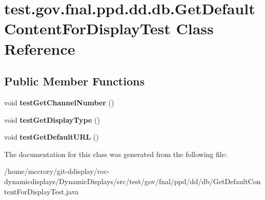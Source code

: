 \hypertarget{classtest_1_1gov_1_1fnal_1_1ppd_1_1dd_1_1db_1_1GetDefaultContentForDisplayTest}{\section{test.\-gov.\-fnal.\-ppd.\-dd.\-db.\-Get\-Default\-Content\-For\-Display\-Test Class Reference}
\label{classtest_1_1gov_1_1fnal_1_1ppd_1_1dd_1_1db_1_1GetDefaultContentForDisplayTest}
}
\subsection*{Public Member Functions}
\begin{DoxyCompactItemize}
\item 
\hypertarget{classtest_1_1gov_1_1fnal_1_1ppd_1_1dd_1_1db_1_1GetDefaultContentForDisplayTest_a537c7cee8b9dbb1afadb523af89feda6}{void {\bfseries test\-Get\-Channel\-Number} ()}\label{classtest_1_1gov_1_1fnal_1_1ppd_1_1dd_1_1db_1_1GetDefaultContentForDisplayTest_a537c7cee8b9dbb1afadb523af89feda6}

\item 
\hypertarget{classtest_1_1gov_1_1fnal_1_1ppd_1_1dd_1_1db_1_1GetDefaultContentForDisplayTest_a949d9e3ff3f8fea11b3cdee4bc8860e4}{void {\bfseries test\-Get\-Display\-Type} ()}\label{classtest_1_1gov_1_1fnal_1_1ppd_1_1dd_1_1db_1_1GetDefaultContentForDisplayTest_a949d9e3ff3f8fea11b3cdee4bc8860e4}

\item 
\hypertarget{classtest_1_1gov_1_1fnal_1_1ppd_1_1dd_1_1db_1_1GetDefaultContentForDisplayTest_a5e31b72bf0bf1b903d7280366872a11e}{void {\bfseries test\-Get\-Default\-U\-R\-L} ()}\label{classtest_1_1gov_1_1fnal_1_1ppd_1_1dd_1_1db_1_1GetDefaultContentForDisplayTest_a5e31b72bf0bf1b903d7280366872a11e}

\end{DoxyCompactItemize}


The documentation for this class was generated from the following file\-:\begin{DoxyCompactItemize}
\item 
/home/mccrory/git-\/ddisplay/roc-\/dynamicdisplays/\-Dynamic\-Displays/src/test/gov/fnal/ppd/dd/db/Get\-Default\-Content\-For\-Display\-Test.\-java\end{DoxyCompactItemize}
